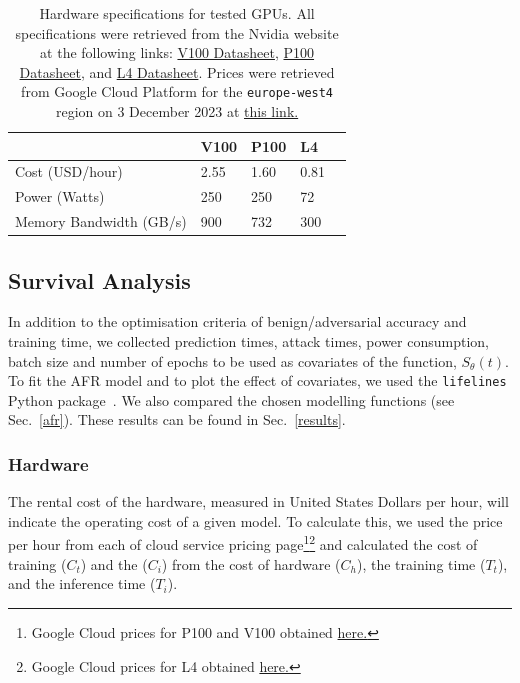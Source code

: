 \documentclass[conference]{IEEEtran}
\begin{document}
\begin{table}[h]
    \centering
    \begin{tabular}{lllll}
    \toprule
                            & V100   & P100   & L4    &  \\
    \midrule
    Cost (USD/hour)         & 2.55   & 1.60   & 0.81   &  \\
    Power (Watts)           & 250    & 250    & 72    &  \\
    Memory Bandwidth (GB/s) & 900    & 732    & 300   &  \\
    \bottomrule
    \end{tabular}
    \caption{Hardware specifications for tested GPUs. All specifications were retrieved from the Nvidia website at the following links: 
    \href{https://images.nvidia.com/content/technologies/volta/pdf/volta-v100-datasheet-update-us-1165301-r5.pdf}{V100 Datasheet},
    \href{https://images.nvidia.com/content/tesla/pdf/nvidia-tesla-p100-PCIe-datasheet.pdf}{P100 Datasheet}, and
    \href{https://nvdam.widen.net/s/rvq98gbwsw/l4-datasheet-2595652}{L4 Datasheet}. Prices were retrieved from Google Cloud Platform for the \texttt{europe-west4} region on 3 December 2023 at \href{https://cloud.google.com/pricing/list}{this link.}
    }
    \label{tab:hardware}
\end{table}

\subsection{Survival Analysis}
In addition to the optimisation criteria of benign/adversarial accuracy and training time, we collected prediction times, attack times, power consumption, batch size and number of epochs to be used as covariates of the function, $S_{\theta}(t)$. To fit the AFR model and to plot the effect of covariates, we used the \texttt{lifelines} Python package~\cite{lifelines}. We also compared the chosen modelling functions (see Sec.~\ref{afr}).  These results can be found in Sec.~\ref{results}.



\subsubsection{Hardware}
The rental cost of the hardware, measured in United States Dollars per hour, will indicate the operating cost of a given model. To calculate this, we used the price per hour from each of cloud service pricing page\footnote{Google Cloud prices for P100 and V100 obtained \href{https://cloud.google.com/compute/gpus-pricing}{here.}}\footnote{Google Cloud prices for L4 obtained  \href{https://cloud.google.com/compute/vm-instance-pricing\#accelerator-optimised}{here.}} and calculated the cost of training ($C_{t}$) and the ($C_{i}$) from the cost of hardware ($C_{h}$), the training time ($T_{t}$), and the inference time ($T_{i}$).
\end{document}
